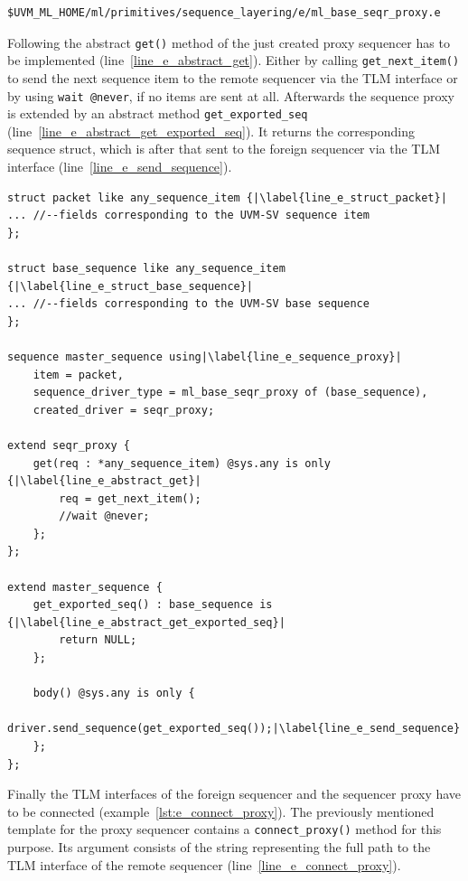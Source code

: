 \smallskip
\begin{lstlisting}
$UVM_ML_HOME/ml/primitives/sequence_layering/e/ml_base_seqr_proxy.e
\end{lstlisting}
\smallskip
Following the abstract \lstinline$get()$ method of the just created proxy sequencer has to be implemented (line~\ref{line_e_abstract_get}). Either by calling \lstinline$get_next_item()$ to send the next sequence item to the remote sequencer via the TLM interface or by using \lstinline$wait @never$, if no items are sent at all. Afterwards the sequence proxy is extended by an abstract method \lstinline$get_exported_seq$ (line~\ref{line_e_abstract_get_exported_seq}). It returns the corresponding sequence struct, which is after that sent to the foreign sequencer via the TLM interface (line~\ref{line_e_send_sequence}).
\lstset{language=e, numbers = left, escapechar=|, breaklines=true}
\begin{lstlisting}[frame=htrbl, caption={\textit{e}: creating a proxy sequencer},
label={lst:e_proxy_sequencer}]
struct packet like any_sequence_item {|\label{line_e_struct_packet}|
... //--fields corresponding to the UVM-SV sequence item
};

struct base_sequence like any_sequence_item {|\label{line_e_struct_base_sequence}|
... //--fields corresponding to the UVM-SV base sequence
};

sequence master_sequence using|\label{line_e_sequence_proxy}|
    item = packet,
    sequence_driver_type = ml_base_seqr_proxy of (base_sequence),
    created_driver = seqr_proxy;

extend seqr_proxy {
    get(req : *any_sequence_item) @sys.any is only {|\label{line_e_abstract_get}|
        req = get_next_item();
        //wait @never;
    };
};

extend master_sequence {
    get_exported_seq() : base_sequence is {|\label{line_e_abstract_get_exported_seq}|
        return NULL;
    };

    body() @sys.any is only {
        driver.send_sequence(get_exported_seq());|\label{line_e_send_sequence}|
    };
};
\end{lstlisting}
Finally the TLM interfaces of the foreign sequencer and the sequencer proxy have to be connected (example~\ref{lst:e_connect_proxy}). The previously mentioned template for the proxy sequencer contains a \lstinline$connect_proxy()$ method for this purpose. Its argument consists of the string representing the full path to the TLM interface of the remote sequencer (line~\ref{line_e_connect_proxy}).
\lstset{language=e, numbers = left, escapechar=|, breaklines=true}
